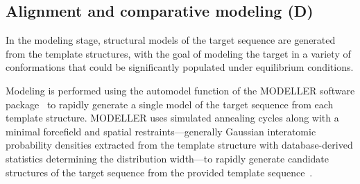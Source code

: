 \documentclass[aps,prl,preprint,nofootinbib,superscriptaddress,linenumbers]{revtex4-1}
\begin{document}

\subsection{Alignment and comparative modeling (D)}

In the modeling stage, structural models of the target sequence are generated from the template structures, with the goal of modeling the target in a variety of conformations that could be significantly populated under equilibrium conditions.

Modeling is performed using the automodel function of the MODELLER software package~\cite{fiser:prot-sci:2000:modeller,sali:jmb:1993:modeller} to rapidly generate a single model of the target sequence from each template structure.
MODELLER uses simulated annealing cycles along with a minimal forcefield and spatial restraints---generally Gaussian interatomic probability densities extracted from the template structure with database-derived statistics determining the distribution width---to rapidly generate candidate structures of the target sequence from the provided template sequence~\cite{fiser:prot-sci:2000:modeller,sali:jmb:1993:modeller}.
\end{document}
